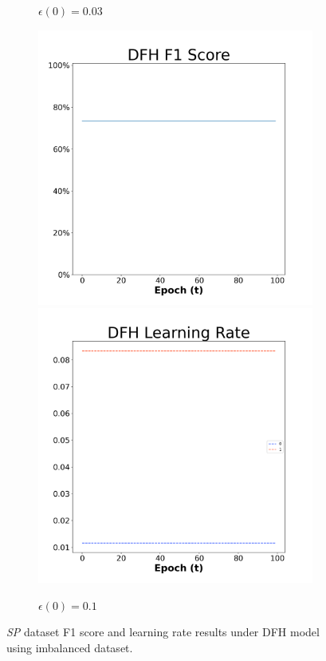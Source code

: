 \begin{figure}[H]
\begin{subfigure}{0.3\textwidth}
  \caption{$\epsilon(0)=0.03$}
\end{subfigure}\hfil %
\begin{subfigure}{0.3\textwidth}
  \includegraphics[width=\linewidth]{images/exper2/SP/DFH_0.1_f1.png}
  \includegraphics[width=\linewidth]{images/exper2/SP/DFH_0.1_lr.png}
  \caption{$\epsilon(0)=0.1$}
\end{subfigure}

\caption{\textit{SP} dataset F1 score and learning rate results under DFH model using imbalanced dataset.}
\end{figure}

